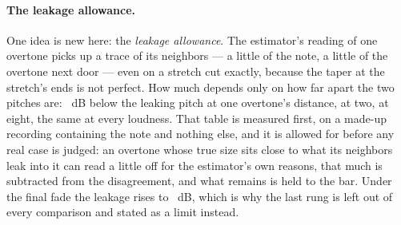 \documentclass[11pt,a4paper]{article}
\begin{document}
\paragraph{The leakage allowance.} One idea is new here: the \emph{leakage
allowance}. The estimator's reading of one overtone picks up a trace of
its neighbors --- a little of the note, a little of the overtone next
door --- even on a stretch cut exactly, because the taper at the
stretch's ends is not perfect. How much depends only on how far apart
the two pitches are: \cparityLeakageOne{}~dB below the leaking pitch at
one overtone's distance, \cparityLeakageTwo{} at two, \cparityLeakageEight{}
at eight, the same at every loudness. That table is measured first, on a
made-up recording containing the note and nothing else, and it is
allowed for before any real case is judged: an overtone whose true size
sits close to what its neighbors leak into it can read a little off for
the estimator's own reasons, that much is subtracted from the
disagreement, and what remains is held to the bar. Under the final fade
the leakage rises to \cparityFadeLeakageOne{}~dB, which is why the last
rung is left out of every comparison and stated as a limit instead.
\end{document}
